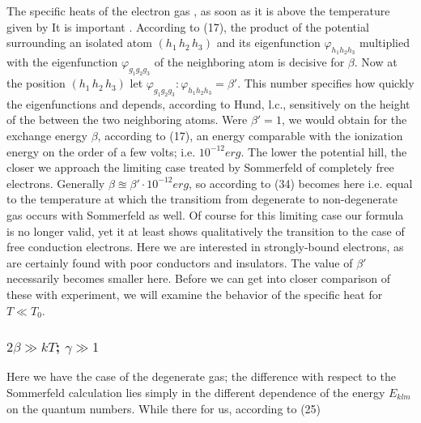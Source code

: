 \begin{paper}{1}
The specific heats of the electron gas , as soon as it is above the temperature given by
It is important . According to (17), the product of the potential surrounding an isolated atom $(h_1\,h_2\,h_3)$ and its eigenfunction $\varphi_{h_1h_2h_3}$
multiplied with the eigenfunction $\varphi_{g_1g_2g_3}$ of the neighboring atom is decisive for $\beta$. Now at the position $(h_1\,h_2\,h_3)$ let $\varphi_{g_1g_2g_3}:\varphi_{h_1h_2h_3} = \beta'$. This number specifies  how quickly the eigenfunctions  and depends, according to Hund, l.c., sensitively on the height of the  between the two neighboring atoms. Were $\beta'=1$, we would obtain for the exchange energy $\beta$, according to (17), an energy comparable with the ionization energy on the order of a few volts; i.e. $10^{-12}\unit{erg}$. The lower the potential hill, the closer we approach the limiting case treated by Sommerfeld of completely free electrons. Generally $\beta\approxeq\beta'\cdot 10^{-12}\unit{erg}$, so according to (34)
becomes here
i.e. equal to the temperature at which the transitiom from degenerate to non-degenerate gas occurs with Sommerfeld as well. Of course for this limiting case our formula is no longer valid, yet it at least shows qualitatively the transition to the case of free conduction electrons. Here we are interested in strongly-bound electrons, as are certainly found with poor conductors and insulators. The value of $\beta'$ necessarily becomes smaller here. Before we can get into closer comparison of these with experiment, we will examine the behavior of the specific heat for $T\ll T_0$.

\subsubsection{$2\beta\gg kT$; $\gamma\gg 1$} Here we have the case of the degenerate gas; the difference with respect to the Sommerfeld calculation lies simply in the different dependence of the energy $E_{klm}$ on the quantum numbers. While there
for us, according to (25)


\end{paper}

